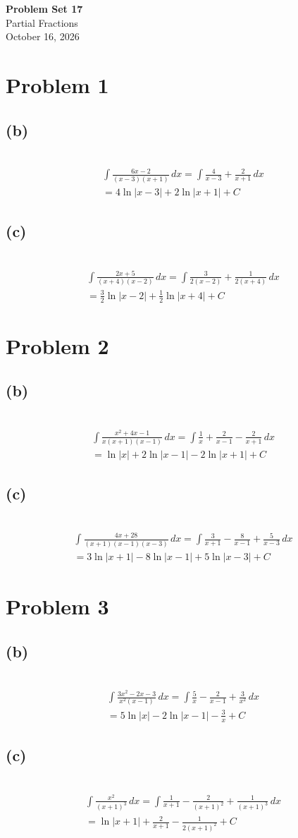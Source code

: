 \documentclass[12pt]{article}
\newcommand{\problem}[1]{\section{Problem #1}}
\newcommand{\subproblem}[1]{\subsection{(#1)} \,}
\begin{document}
\vspace*{0cm}

\begin{center}
    {\Large \bfseries Problem Set 17} \\[0.5cm]
    {\large Partial Fractions} \\[0.35cm]
    {\normalsize October 16, 2026}
\end{center}


\problem{1}

\subproblem{b}
\begin{gather*}
    \int \frac{6x-2}{(x-3)(x+1)}\,dx =\int \frac{4}{x-3} + \frac{2}{x+1}\, dx\\
    = \boxed{4 \ln |x-3| + 2\ln |x+1|+C}
\end{gather*}

\subproblem{c}
\begin{gather*}
    \int \frac{2x+5}{(x+4)(x-2)} \, dx = \int \frac{3}{2(x-2)} + \frac{1}{2(x+4)}  \, dx\\
    = \boxed{ \frac{3}{2} \ln |x-2| + \frac{1}{2} \ln |x+4|+C}
\end{gather*}

\problem{2}

\subproblem{b}
\begin{gather*}
    \int \frac{x^2+4x-1}{x(x+1)(x-1)} \, dx = \int \frac{1}{x} + \frac{2}{x-1} - \frac{2}{x+1} \, dx\\
    = \boxed{\ln |x| + 2 \ln |x-1| -2 \ln|x+1|+C}
\end{gather*}

\subproblem{c}
\begin{gather*}
    \int \frac{4x+28}{(x+1)(x-1)(x-3)} \, dx = \int \frac{3}{x+1}- \frac{8}{x-1} +\frac{5}{x-3}\, dx\\
    = \boxed{ 3 \ln |x+1| - 8 \ln |x-1| + 5\ln |x-3|+C}
\end{gather*}

\problem{3}

\subproblem{b}
\begin{gather*}
    \int \frac{3x^2-2x-3}{x^2(x-1)}\, dx= \int \frac{5}{x} - \frac{2}{x-1} + \frac{3}{x^2}\, dx\\
    = \boxed{ 5 \ln |x| - 2\ln |x-1| - \frac{3}{x}+C}
\end{gather*}

\subproblem{c}
\begin{gather*}
    \int \frac{x^2}{(x+1)^3} \, dx = \int \frac{1}{x+1} - \frac{2}{(x+1)^2} + \frac{1}{(x+1)^3} \, dx\\
    = \boxed{\ln |x+1|+ \frac{2}{x+1}   - \frac{1}{2(x+1)^2} +C} 
\end{gather*}
\end{document}
